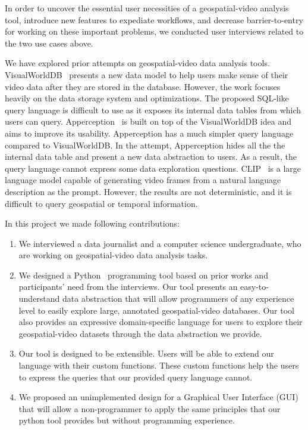 In order to uncover the essential user necessities of a geospatial-video analysis tool, introduce new features to expediate workflows, and decrease barrier-to-entry for working on these important problems, we conducted user interviews related to the two use cases above.

We have explored prior attempts on geospatial-video data analysis tools.
VisualWorldDB~\cite{haynes:visualworlddb} presents a new data model to help users make sense of their video data after they are stored in the database.
However, the work focuses heavily on the data storage system and optimizations.
The proposed SQL-like query language is difficult to use as it exposes its internal data tables from which users can query.
Apperception~\cite{ge:apperception} is built on top of the VisualWorldDB idea and aims to improve its usability.
Apperception has a much simpler query language compared to VisualWorldDB.
In the attempt, Apperception hides all the the internal data table and present a new data abstraction to users.
As a result, the query language cannot express some data exploration questions.
CLIP~\cite{radford:clip} is a large language model capable of generating video frames from a natural language description as the prompt. 
However, the results are not deterministic, and it is difficult to query geospatial or temporal information.

In this project we made following contributions:
\begin{enumerate}
    \item
    We interviewed a data journalist and a computer science undergraduate,
    who are working on geospatial-video data analysis tasks.
    \item
    We designed a Python~\cite{van:python} programming tool based on prior works and participants' need from the interviews.
    Our tool presents an easy-to-understand data abstraction that will allow programmers of any experience level to easily explore large, annotated geospatial-video databases. Our tool also provides an expressive domain-specific language for users to explore their geospatial-video datasets through the data abstraction we provide.
    \item
    Our tool is designed to be extensible.
    Users will be able to extend our language with their custom functions.
    These custom functions help the users to express the queries that our provided query language cannot.
    \item
    We proposed an unimplemented design for a Graphical User Interface (GUI) that will allow a non-programmer to apply the same principles that our python tool provides but without programming experience.
\end{enumerate}
